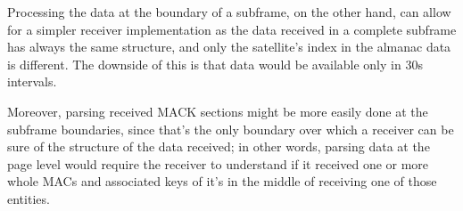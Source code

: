 Processing the data at the boundary of a subframe, on the other hand, can
allow for a simpler receiver implementation as the data received in a complete
subframe has always the same structure, and only the satellite's index in the
almanac data is different. The downside of this is that data would be available
only in \num{30}\si{s} intervals.

Moreover, parsing received MACK sections might be more easily done at the
subframe boundaries, since that's the only boundary over which a receiver can be
sure of the structure of the data received; in other words, parsing data at the
page level would require the receiver to understand if it received one or more
whole MACs and associated keys of it's in the middle of receiving one of those
entities.

\vspace{\baselineskip}

